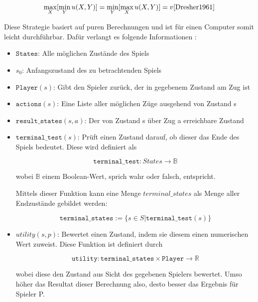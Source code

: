 \begin{equation}
\max\limits_X[\min\limits_Yu(X,Y)] = \min\limits_Y[\max\limits_Xu(X,Y)] = v \cite{Dresher1961}
\end{equation}

Diese Strategie basiert auf puren Berechnungen und ist für einen Computer somit leicht durchführbar. Dafür verlangt es folgende Informationen \cite{Stroetmann2018}:

\begin{itemize}
\item \textbf{$\mathtt{States}$}: Alle möglichen Zustände des Spiels
\item \textbf{$s_0$}: Anfangszustand des zu betrachtenden Spiels
\item \textbf{$\mathtt{Player}(s)$}: Gibt den Spieler zurück, der in gegebenem Zustand am Zug ist
\item \textbf{$\mathtt{actions}(s)$}: Eine Liste aller möglichen Züge ausgehend von Zustand s
\item \textbf{$\mathtt{result\_states}(s,a)$}: Der von Zustand s über Zug a erreichbare Zustand
\item \textbf{$\mathtt{terminal\_test}(s)$}: Prüft einen Zustand darauf, ob dieser das Ende des Spiels bedeutet. Diese wird definiert als

\begin{equation}
\mathtt{terminal\_test} : States \rightarrow \mathbb{B}
\end{equation}

wobei $\mathbb{B}$ einem Boolean-Wert, sprich wahr oder falsch, entspricht.

Mittels dieser Funktion kann eine Menge $terminal\_states$ als Menge aller Endzustände gebildet werden:

\begin{equation}
\mathtt{terminal\_states} := \{s \in S | \mathtt{terminal\_test}(s)\}
\end{equation}

\item \textbf{$utility(s, p)$}: Bewertet einen Zustand, indem sie diesem einen numerischen Wert zuweist. Diese Funktion ist definiert durch

\begin{equation}
\mathtt{utility} : \mathtt{terminal\_states} \times \mathtt{Player} \rightarrow \mathbb{R}
\end{equation}

wobei diese den Zustand aus Sicht des gegebenen Spielers bewertet. Umso höher das Resultat dieser Berechnung also, desto besser das Ergebnis für Spieler P.
\end{itemize}

